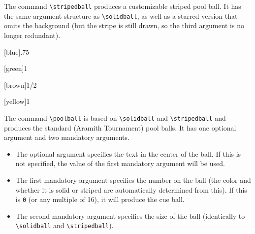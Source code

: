 \documentclass[10pt]{extarticle}
\newcommand{\<}{\langle}
\renewcommand{\>}{\rangle}
\theoremstyle{mystyle}{\newtheorem*{remark}{Remark}}
\theoremstyle{mystyle}{\newtheorem*{remarks}{Remarks}}
\theoremstyle{mystyle}{\newtheorem*{example}{Example}}
\theoremstyle{mystyle}{\newtheorem*{examples}{Examples}}
\theoremstyle{definition}{\newtheorem*{exercise}{Exercise}}
\theoremstyle{warn}
\begin{document}
The command \verb!\stripedball! produces a customizable striped pool ball. It has the same argument structure as \verb!\solidball!, as well as a starred version that omits the background (but the stripe is still drawn, so the third argument is no longer redundant).

\begin{tcolorbox}[blanker,sidebyside,before skip=10pt,after skip=10pt]
\begin{verbbox}[righthand width=1.3cm]
\end{verbbox}
\begin{verbbox}[righthand width=1.3cm]
\end{verbbox}
\begin{verbbox}[righthand width=1.3cm]
[blue]{.75}
\end{verbbox}
\begin{verbbox}[righthand width=1.3cm]
[green]{1}
\end{verbbox}
\tcblower %
\begin{verbbox}[righthand width=1.3cm]
\end{verbbox}
\begin{verbbox}[righthand width=1.3cm]
[brown]{1/2}
\end{verbbox}
\begin{verbbox}[righthand width=1.3cm]
\end{verbbox}
\begin{verbbox}[righthand width=1.3cm]
[yellow]{1}
\end{verbbox}
\end{tcolorbox}

\newpage %

The command \verb!\poolball! is based on \verb!\solidball! and \verb!\stripedball! and produces the standard (Aramith Tournament) pool balls. It has one optional argument and two mandatory arguments.
\begin{itemize}
    \item The optional argument specifies the text in the center of the ball. If this is not specified, the value of the first mandatory argument will be used.
    \item The first mandatory argument specifies the number on the ball (the color and whether it is solid or striped are automatically determined from this). If this is \texttt{0} (or any multiple of 16), it will produce the cue ball.
    \item The second mandatory argument specifies the size of the ball (identically to \verb!\solidball! and \verb!\stripedball!).
\end{itemize}
\end{document}
